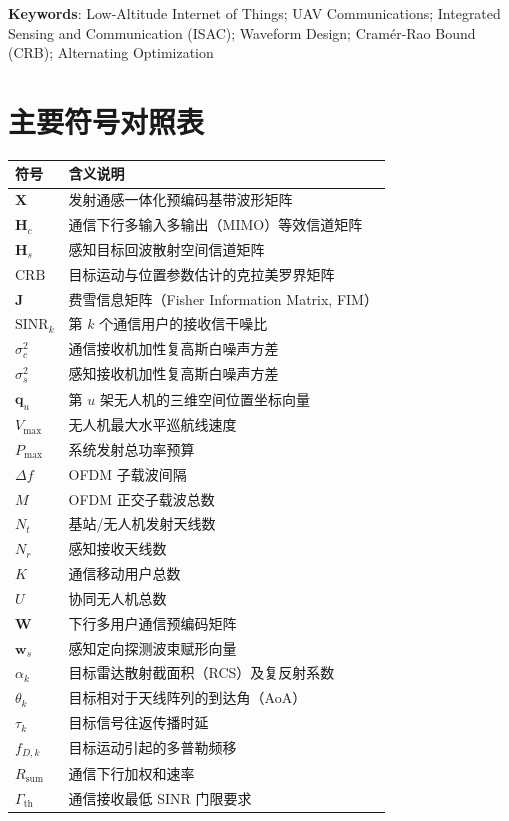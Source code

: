 \documentclass[12pt,a4paper,openany,UTF8]{ctexrep}
\begin{document}
\vspace{0.6cm}
\noindent \textbf{Keywords}: Low-Altitude Internet of Things; UAV Communications; Integrated Sensing and Communication (ISAC); Waveform Design; Cramér-Rao Bound (CRB); Alternating Optimization
\newpage

\tableofcontents
\newpage

\listoffigures
\newpage
\listoftables
\newpage

\chapter*{主要符号对照表}
\begin{center}
\begin{tabular}{ll}
  \toprule
  \textbf{符号} & \textbf{含义说明} \\
  \midrule
  $\mathbf{X}$ & 发射通感一体化预编码基带波形矩阵 \\
  $\mathbf{H}_c$ & 通信下行多输入多输出（MIMO）等效信道矩阵 \\
  $\mathbf{H}_s$ & 感知目标回波散射空间信道矩阵 \\
  $\mathrm{CRB}$ & 目标运动与位置参数估计的克拉美罗界矩阵 \\
  $\mathbf{J}$ & 费雪信息矩阵（Fisher Information Matrix, FIM） \\
  $\mathrm{SINR}_k$ & 第 $k$ 个通信用户的接收信干噪比 \\
  $\sigma_c^2$ & 通信接收机加性复高斯白噪声方差 \\
  $\sigma_s^2$ & 感知接收机加性复高斯白噪声方差 \\
  $\mathbf{q}_u$ & 第 $u$ 架无人机的三维空间位置坐标向量 \\
  $V_{\max}$ & 无人机最大水平巡航线速度 \\
  $P_{\max}$ & 系统发射总功率预算 \\
  $\Delta f$ & OFDM 子载波间隔 \\
  $M$ & OFDM 正交子载波总数 \\
  $N_t$ & 基站/无人机发射天线数 \\
  $N_r$ & 感知接收天线数 \\
  $K$ & 通信移动用户总数 \\
  $U$ & 协同无人机总数 \\
  $\mathbf{W}$ & 下行多用户通信预编码矩阵 \\
  $\mathbf{w}_s$ & 感知定向探测波束赋形向量 \\
  $\alpha_k$ & 目标雷达散射截面积（RCS）及复反射系数 \\
  $\theta_k$ & 目标相对于天线阵列的到达角（AoA） \\
  $\tau_k$ & 目标信号往返传播时延 \\
  $f_{D,k}$ & 目标运动引起的多普勒频移 \\
  $R_{\mathrm{sum}}$ & 通信下行加权和速率 \\
  $\Gamma_{\mathrm{th}}$ & 通信接收最低 SINR 门限要求 \\
  \bottomrule
\end{tabular}
\end{center}
\newpage
\end{document}
